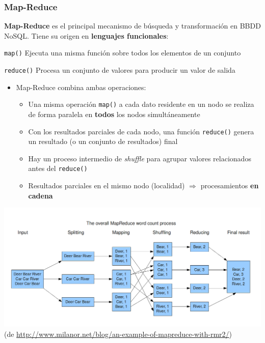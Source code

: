\documentclass[14pt]{beamer}
\begin{document}
\begin{frame}
\frametitle{Map-Reduce}

 {\bf Map-Reduce} es el principal mecanismo de búsqueda y transformación en
 BBDD NoSQL. Tiene su origen en {\bf lenguajes funcionales}:
  \begin{block}{{\tt map()}}
    Ejecuta una misma función sobre todos los elementos de un conjunto
  \end{block}
  \begin{block}{{\tt reduce()}}
    Procesa un conjunto de valores para producir un valor de salida
  \end{block}

\framebreak

\begin{itemize}

\item Map-Reduce combina ambas operaciones:
\begin{itemize}
\item Una misma operación {\tt map()} a cada dato residente en un nodo se
  realiza de forma paralela en {\bf todos} los nodos simultáneamente
\item Con los resultados parciales de cada nodo, una función {\tt reduce()}
  genera un resultado (o un conjunto de resultados) final
\item Hay un proceso intermedio de {\em shuffle} para agrupar valores
  relacionados antes del {\tt reduce()}
\item Resultados parciales en el mismo nodo (localidad) $\Rightarrow$
  procesamientos {\bf en cadena}
\end{itemize}
\end{itemize}



\framebreak

\centering\includegraphics[width=\textwidth]{img/MapReduceWordcount}
(de \url{http://www.milanor.net/blog/an-example-of-mapreduce-with-rmr2/})
\end{frame}
\end{document}
